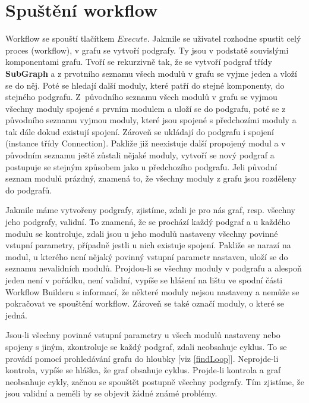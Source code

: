 \newpage
\section{Spuštění workflow}
\nocite{demel:book}
Workflow se spouští tlačítkem $Execute$. Jakmile se uživatel rozhodne
spustit celý proces (workflow), v grafu se vytvoří podgrafy. Ty jsou v
podstatě souvislými komponentami grafu. Tvoří se rekurzivně tak, že se
vytvoří podgraf třídy \textbf{SubGraph} a z prvotního seznamu všech
modulů v grafu se vyjme jeden a vloží se do něj. Poté se hledají další
moduly, které patří do stejné komponenty, do stejného
podgrafu. Z~původního seznamu všech modulů v grafu se vyjmou všechny
moduly spojené s prvním modulem a uloží se do podgrafu, poté se z
původního seznamu vyjmou moduly, které jsou spojené s předchozími
moduly a tak dále dokud existují spojení. Zároveň se ukládají do
podgrafu i spojení (instance třídy Connection). Pakliže již neexistuje
další propojený modul a v původním seznamu ještě zůstali nějaké
moduly, vytvoří se nový podgraf a postupuje se stejným způsobem jako u
předchozího podgrafu. Jeli původní seznam modulů prázdný, znamená to,
že všechny moduly z grafu jsou rozděleny do podgrafů.

Jakmile máme vytvořeny podgrafy, zjistíme, zdali je pro nás graf,
resp. všechny jeho podgrafy, validní. To znamená, že se prochází každý
podgraf a u každého modulu se kontroluje, zdali jsou u jeho modulů
nastaveny všechny povinné vstupní parametry, případně jestli u nich
existuje spojení. Pakliže se narazí na modul, u kterého není nějaký
povinný vstupní parametr nastaven, uloží se do seznamu nevalidních
modulů. Projdou-li se všechny moduly v podgrafu a alespoň jeden není v
pořádku, není validní, vypíše se hlášení na lištu ve spodní části
Workflow Builderu s informací, že některé moduly nejsou nastaveny a
nemůže se pokračovat ve spouštění workflow. Zároveň se také označí
moduly, o které se jedná.

Jsou-li všechny povinné vstupní parametry u všech modulů nastaveny
nebo spojeny s jiným, zkontroluje se každý podgraf, zdali neobsahuje
cyklus. To se provádí pomocí prohledávání grafu do hloubky
[viz \lstlistingname \ref{findLoop}]. Neprojde-li kontrola, vypíše se
hláška, že graf obsahuje cyklus. Projde-li kontrola a graf neobsahuje
cykly, začnou se spouštět postupně všechny podgrafy. Tím zjistíme, že
jsou validní a neměli by se objevit žádné známé problémy.


